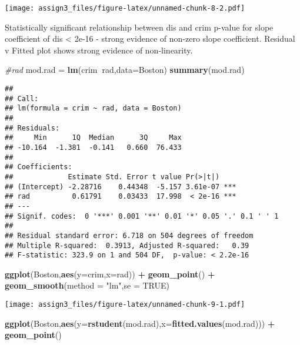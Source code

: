 \documentclass[]{article}
\newenvironment{Shaded}{\begin{snugshade}}{\end{snugshade}}
\newcommand{\CommentTok}[1]{\textcolor[rgb]{0.56,0.35,0.01}{\textit{#1}}}
\newcommand{\DataTypeTok}[1]{\textcolor[rgb]{0.13,0.29,0.53}{#1}}
\newcommand{\KeywordTok}[1]{\textcolor[rgb]{0.13,0.29,0.53}{\textbf{#1}}}
\newcommand{\NormalTok}[1]{#1}
\newcommand{\OperatorTok}[1]{\textcolor[rgb]{0.81,0.36,0.00}{\textbf{#1}}}
\newcommand{\OtherTok}[1]{\textcolor[rgb]{0.56,0.35,0.01}{#1}}
\newcommand{\StringTok}[1]{\textcolor[rgb]{0.31,0.60,0.02}{#1}}
\begin{document}
\texttt{[image: assign3\_files/figure-latex/unnamed-chunk-8-2.pdf]}

Statistically significant relationship between dis and crim p-value for
slope coefficient of dis \textless{} 2e-16 - strong evidence of non-zero
slope coefficient. Residual v Fitted plot shows strong evidence of
non-linearity.

\begin{Shaded}
\begin{Highlighting}[]
\CommentTok{#rad}
\NormalTok{mod.rad =}\StringTok{ }\KeywordTok{lm}\NormalTok{(crim}\OperatorTok{~}\NormalTok{rad,}\DataTypeTok{data=}\NormalTok{Boston)}
\KeywordTok{summary}\NormalTok{(mod.rad)}
\end{Highlighting}
\end{Shaded}

\begin{verbatim}
## 
## Call:
## lm(formula = crim ~ rad, data = Boston)
## 
## Residuals:
##     Min      1Q  Median      3Q     Max 
## -10.164  -1.381  -0.141   0.660  76.433 
## 
## Coefficients:
##             Estimate Std. Error t value Pr(>|t|)    
## (Intercept) -2.28716    0.44348  -5.157 3.61e-07 ***
## rad          0.61791    0.03433  17.998  < 2e-16 ***
## ---
## Signif. codes:  0 '***' 0.001 '**' 0.01 '*' 0.05 '.' 0.1 ' ' 1
## 
## Residual standard error: 6.718 on 504 degrees of freedom
## Multiple R-squared:  0.3913, Adjusted R-squared:   0.39 
## F-statistic: 323.9 on 1 and 504 DF,  p-value: < 2.2e-16
\end{verbatim}

\begin{Shaded}
\begin{Highlighting}[]
\KeywordTok{ggplot}\NormalTok{(Boston,}\KeywordTok{aes}\NormalTok{(}\DataTypeTok{y=}\NormalTok{crim,}\DataTypeTok{x=}\NormalTok{rad)) }\OperatorTok{+}\StringTok{ }\KeywordTok{geom_point}\NormalTok{() }\OperatorTok{+}\StringTok{ }\KeywordTok{geom_smooth}\NormalTok{(}\DataTypeTok{method =} \StringTok{"lm"}\NormalTok{,}\DataTypeTok{se =} \OtherTok{TRUE}\NormalTok{)}
\end{Highlighting}
\end{Shaded}

\texttt{[image: assign3\_files/figure-latex/unnamed-chunk-9-1.pdf]}

\begin{Shaded}
\begin{Highlighting}[]
\KeywordTok{ggplot}\NormalTok{(Boston,}\KeywordTok{aes}\NormalTok{(}\DataTypeTok{y=}\KeywordTok{rstudent}\NormalTok{(mod.rad),}\DataTypeTok{x=}\KeywordTok{fitted.values}\NormalTok{(mod.rad))) }\OperatorTok{+}\StringTok{ }\KeywordTok{geom_point}\NormalTok{() }
\end{Highlighting}
\end{Shaded}
\end{document}

